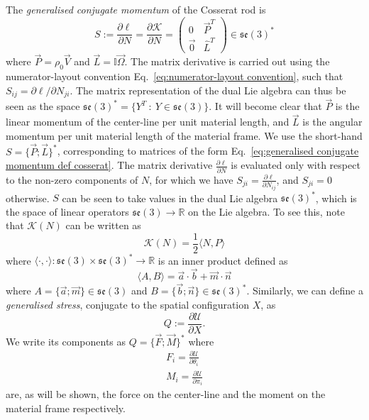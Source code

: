 The \textit{generalised conjugate momentum} of the Cosserat rod is
\begin{equation} \label{eq:generalised conjugate momentum def cosserat}
S := \frac{\partial \ell}{\partial N}  = \frac{\partial \mathcal{K}}{\partial N} = \begin{pmatrix}
0 & \vec{P}^T \\ 
\vec{0} & \hat{L}^T
\end{pmatrix}  \in \mathfrak{se}(3)^*
\end{equation}
where $\vec{P} = \rho_0 \vec{V}$ and $\vec{L} = \mathbb{I} \vec{\Omega}$. The matrix derivative is carried out using the numerator-layout convention Eq.~\ref{eq:numerator-layout convention}, such that $S_{ij} = \partial \ell /\partial N_{ji}$. The matrix representation of the dual Lie algebra can thus be seen as the space $\mathfrak{se}(3)^* = \{ Y^T\ :\ Y \in \mathfrak{se}(3) \}$. It will become clear that $\vec{P}$ is the linear momentum of the center-line per unit material length, and $\vec{L}$ is the angular momentum per unit material length of the material frame. We use the short-hand $S = \{ \vec{P} ; \vec{L} \}^*$, corresponding to matrices of the form Eq.~\ref{eq:generalised conjugate momentum def cosserat}. The matrix derivative $\frac{\partial \ell}{\partial N}$ is evaluated only with respect to the non-zero components of $N$, for which we have $S_{ji} = \frac{\partial \ell}{\partial N_{ij}}$, and $S_{ji} = 0$ otherwise. $S$ can be seen to take values in the dual Lie algebra $\mathfrak{se}(3)^*$, which is the space of linear operators $\mathfrak{se}(3) \to \mathbb{R}$ on the Lie algebra. To see this, note that $\mathcal{K}(N)$ can be written as
\begin{equation}
\mathcal{K}(N) = \frac{1}{2} \langle N, P \rangle
\end{equation}
where $\langle \cdot , \cdot \rangle : \mathfrak{se}(3) \times \mathfrak{se}(3)^* \to \mathbb{R}$ is an inner product defined as
\begin{equation}
\langle A , B \rangle =  \vec{a} \cdot \vec{b} + \vec{m} \cdot \vec{n}
\end{equation}
where $A = \{\vec{a}; \vec{m}\} \in \mathfrak{se}(3)$ and $B = \{\vec{b}; \vec{n}\} \in \mathfrak{se}(3)^*$. Similarly, we can define a \textit{generalised stress}, conjugate to the spatial configuration $X$, as
\begin{equation}
Q := \frac{\partial \mathcal{U}}{\partial X}.
\end{equation}
We write its components as $Q = \{ \vec{F} ; \vec{M} \}^*$ where
\begin{subequations} \label{eq:F_i and M_i from U}
\begin{align}
F_i = \frac{\partial \mathcal{U}}{\partial \theta_i} \\
M_i = \frac{\partial \mathcal{U}}{\partial \pi_i} 
\end{align}
\end{subequations}
are, as will be shown, the force on the center-line and the moment on the material frame respectively.

